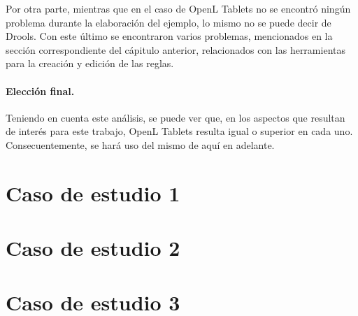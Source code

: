 Por otra parte, mientras que en el caso de OpenL Tablets no se encontró ningún problema durante la elaboración del ejemplo, lo mismo no se puede decir de Drools. Con este último se encontraron varios problemas, mencionados en la sección correspondiente del cápitulo anterior, relacionados con las herramientas para la creación y edición de las reglas.

\paragraph{Elección final.}
Teniendo en cuenta este análisis, se puede ver que, en los aspectos que resultan de interés para este trabajo, OpenL Tablets resulta igual o superior en cada uno. Consecuentemente, se hará uso del mismo de aquí en adelante.

\section{Caso de estudio 1}



\section{Caso de estudio 2}

\section{Caso de estudio 3}